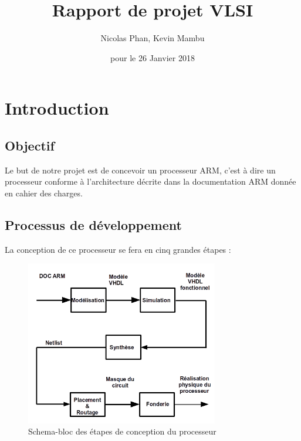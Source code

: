 \documentclass{article}
\title{Rapport de projet VLSI}
\author{Nicolas Phan, Kevin Mambu}
\date{pour le 26 Janvier 2018}
\begin{document}
\pagestyle{headings}
\maketitle
\tableofcontents
\newpage

\section{Introduction}

\subsection{Objectif}

Le but de notre projet est de concevoir un processeur ARM, c'est à dire un processeur conforme
à l'architecture décrite dans la documentation ARM donnée en cahier des charges.

\subsection{Processus de développement}

La conception de ce processeur se fera en cinq grandes étapes :

\begin{figure}[H]
\includegraphics[width=0.75\textwidth]{pics/conception1.png}
\centering
\caption{Schema-bloc des étapes de conception du processeur}
\label{conception}
\end{figure}
\end{document}

